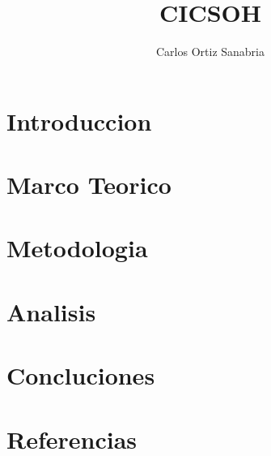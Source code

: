 \documentclass[
    a4paper,
    spanish,
    12pt,
    draftall,
    doc
    ]{apa6}
\title{CICSOH}
\affiliation{Universidad Cenfotec}
\author{Carlos Ortiz Sanabria}
\begin{document}
\maketitle
\thispagestyle{firstpage}
\justifying
\section{Introduccion}
\lipsum[1-2]
\section{Marco Teorico}
\lipsum[1-2]
\section{Metodologia}
\lipsum[1-2]
\section{Analisis}
\lipsum[1-2]
\section{Concluciones}

\section{Referencias}
\printbibliography
\end{document}
